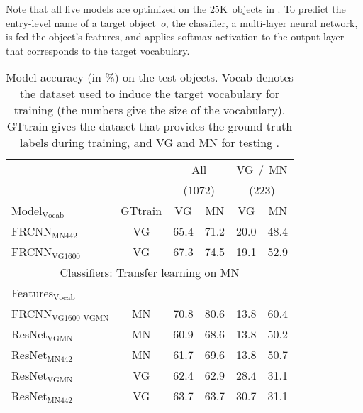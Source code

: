 Note that all five models are optimized on the $25$K~objects in \mn. 
To predict the entry-level name of a target object~$o$, the classifier, a multi-layer neural network, is fed the object's features, and applies softmax activation to the output layer that corresponds to the target vocabulary. 

\iffalse
\begin{table}[t]
	\centering
	\small
	\begin{tabular}{@{~}l@{~}|@{~}c@{~}|cc|cc@{~}}
		\toprule
		&  & \multicolumn{2}{c}{All} 
		& \multicolumn{2}{c}{VG$\neq$MN}\\
		&  & \multicolumn{2}{c}{($1072$)} 
		& \multicolumn{2}{c}{($223$)}\\	
		Model$_{\text{Vocab}}$ 
		&  GTtrain &  VG & MN 
		&  VG & MN \\ 
		\midrule
		FRCNN$_{\text{MN442}}$ & VG &  65.4 &      71.2 &   20.0 &      48.4  \\
		FRCNN$_{\text{VG1600}}$ & VG &    67.3 &      74.5 &    19.1 &      52.9  \\
		\midrule \midrule
		\multicolumn{6}{c}{Classifiers: Transfer learning on MN}\\
		Features$_{\text{Vocab}}$ &   \\
		\midrule 
		FRCNN$_{\text{VG1600}}$$_{\text{-VGMN}}$ & MN &    70.8 &      80.6 &    13.8 &      60.4  \\ 
		\midrule
		ResNet$_{\text{VGMN}}$ & MN  & 60.9 &  68.6 &  13.8 & 50.2  \\
		
		ResNet$_{\text{MN442}}$ & MN &            61.7 &              69.6 &                        13.8 &              50.7 \\
		ResNet$_{\text{VGMN}}$  &   VG &  62.4 &              62.9 &              28.4 &              31.1  \\
		ResNet$_{\text{MN442}}$ & VG  &            63.7 &              63.7 &                  30.7 &              31.1  \\
		\bottomrule
	\end{tabular}
	\caption{Model accuracy (in \%) on the \mn test objects. Vocab denotes the dataset used to induce the target vocabulary for training (the numbers give the size of the vocabulary). GTtrain gives the dataset that provides the ground truth labels during training, and VG and MN for testing \label{tab:exp_VGvsMN}.}
\end{table}
